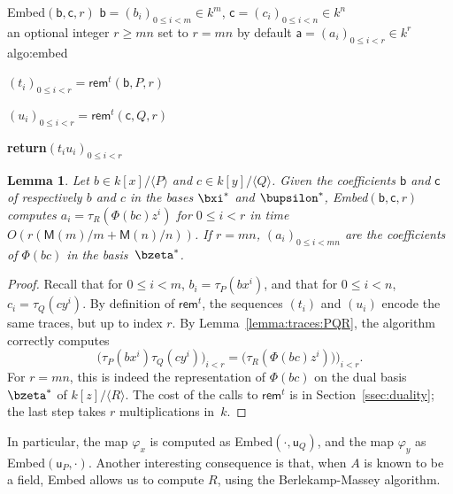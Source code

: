 \documentclass{sig-alternate}
\def\M {\ensuremath{\mathsf{M}}}
\def\va {\ensuremath{\mathsf{a}}}
\def\vu {\ensuremath{\mathsf{u}}}
\def\vb {\ensuremath{\mathsf{b}}}
\def\vc {\ensuremath{\mathsf{c}}}
\def\rem {\ensuremath{\mathsf{rem}}}
\newcounter{algo}
\newenvironment{algorithm_endline}[4]{\small\begin{center}\begin{minipage}{0.48\textwidth}
      \refstepcounter{algo}
      \label{#4}
      \sf
      \rule{\textwidth}{0.2pt}\\
      \makebox[\textwidth][c]{Algorithm~\arabic{algo}:~\textbf{#1}}\\
      \rule[0.5\baselineskip]{\textwidth}{0.2pt}\\

      \vspace{-12pt}

      \parbox{\textwidth}{\textbf{Input} #2}
      \parbox{\textwidth}{\textbf{Output} #3}

\vspace{-7pt}

      \begin{enumerate*}}{\end{enumerate*}
      \vspace{-11pt}
      \rule{\textwidth}{0.2pt}
\end{minipage}\end{center}
}
\newcommand{\ang}[1]{\langle#1\rangle}
\newtheorem{Lemma}{Lemma}
\begin{document}
\begin{algorithm_endline}
{Embed$(\vb,\vc,r)$}
{$\vb=(b_i)_{0 \le i < m} \in k^m$, $\vc=(c_i)_{0 \le i < n} \in k^n$\\
    an optional integer $r \ge mn$ set to $r=mn$ by default}
{$\va=(a_i)_{0 \le i < r} \in k^{r}$}
{algo:embed}
\item $(t_i)_{0\le i<r} = \rem^t(\vb,P,r)$
\item $(u_i)_{0\le i<r} = \rem^t(\vc,Q,r)$
\item {\bf return}$(t_i u_i)_{0 \le i <r}$
\end{algorithm_endline}

\begin{Lemma}\label{lemma:algo:embed}
  Let $b \in k[x]/\ang{P}$ and $c \in k[y]/\ang{Q}$.  Given the
  coefficients $\vb$ and $\vc$ of respectively $b$ and $c$ in the
  bases $\bxi^\ast$ and $\bupsilon^\ast$, {\sf Embed}$(\vb,\vc,r)$
  computes $a_i=\tau_R\left(\Phi(bc)z^i\right)$ for $0 \le i < r$ in time
  $O(r(\M(m)/m+\M(n)/n))$. If $r=mn$, $(a_i)_{0 \le i < mn}$ are
  the coefficients of $\Phi(bc)$ in the basis~$\bzeta^\ast$.
\end{Lemma}
\begin{proof}
  Recall that for $0 \le i <m$, $b_i = \tau_P(bx^i)$, and that for $0
  \le i < n$, $c_i = \tau_Q(cy^i)$. By definition of $\rem^t$, the
  sequences $(t_i)$ and $(u_i)$ encode the same traces, but up to
  index $r$.  By Lemma~\ref{lemma:traces:PQR}, the algorithm correctly
  computes
$$ \bigl(\tau_P(bx^i)\tau_Q(cy^i)\bigr)_{i<r} = \bigl(\tau_R(\Phi(bc)
  z^i))\bigr)_{i<r}.$$ For $r=mn$, this is indeed the representation
  of $\Phi(bc)$ on the dual basis $\bzeta^\ast$ of $k[z]/\ang{R}$. The
  cost of the calls to $\rem^t$ is in Section~\ref{ssec:duality}; the
  last step takes $r$ multiplications in~$k$.
\end{proof}

In particular, the map $\varphi_x$ is computed as
{\sf Embed}$(\cdot,\vu_Q)$, and the map $\varphi_y$ as
{\sf Embed}$(\vu_P,\cdot)$. Another interesting consequence is that, when
$A$ is known to be a field, {\sf Embed} allows us to compute $R$, using the
Berlekamp-Massey algorithm.

\vspace{-2ex}
\end{document}
